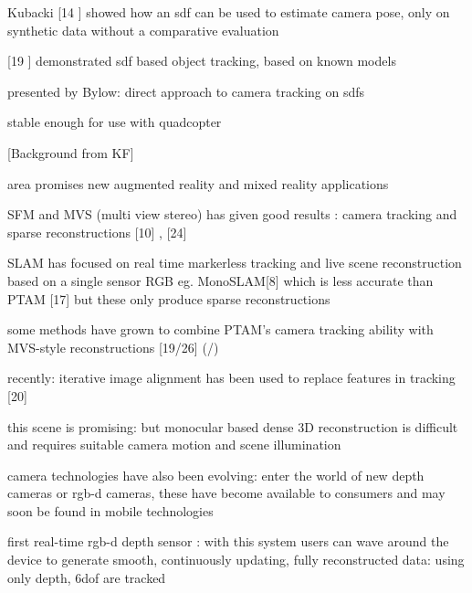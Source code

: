 Kubacki [14 \cite{Kubacki12Registration}] showed how an sdf can be used to estimate camera pose, only on synthetic data without a comparative evaluation

[19 \cite{Ren12Unified}] demonstrated sdf based object tracking, based on known models

presented by Bylow: direct approach to camera tracking on sdfs


stable enough for use with quadcopter























[Background from KF]

area promises new augmented reality and mixed reality applications

SFM and MVS (multi view stereo) has given good results : camera tracking  and sparse reconstructions [10] \cite{Fitzgibbon98Automatic}, \cite{Seitz06Comparison} [24] 

SLAM has focused on real time markerless tracking and live scene reconstruction based on a single sensor RGB eg. MonoSLAM[8] \cite{Davison03Real} which is less accurate than PTAM [17] \cite{Klein07Parallel}  but these only produce sparse reconstructions

some methods have grown to combine PTAM's camera tracking ability with MVS-style reconstructions [19/26] (\cite{Newcombe10Live}/\cite{Stuhmer10Real})

recently: iterative image alignment has been used to replace features in tracking [20] \cite{Newcombe11Dtam}

this scene is promising: but monocular based dense 3D reconstruction is difficult and requires suitable camera motion and scene illumination

camera technologies have also been evolving: enter the world of new depth cameras or rgb-d cameras,
these have become available to consumers and may soon be found in mobile technologies \cite{Zhang12Microsoft}

first real-time rgb-d depth sensor : with this system users can wave around the device to generate smooth, continuously updating, fully reconstructed data: using only depth, 6dof are tracked


